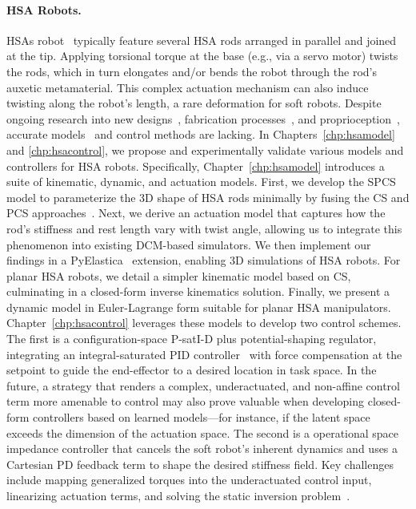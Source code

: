 \paragraph{HSA Robots.}
\glspl{HSA} robot~\citep{lipton2018handedness, chin2018compliant} typically feature several \gls{HSA} rods arranged in parallel and joined at the tip. Applying torsional torque at the base (e.g., via a servo motor) twists the rods, which in turn elongates and/or bends the robot through the rod’s auxetic metamaterial. This complex actuation mechanism can also induce twisting along the robot’s length, a rare deformation for soft robots. Despite ongoing research into new designs~\citep{good2022expanding, good2025torque}, fabrication processes~\citep{truby2021recipe}, and proprioception~\citep{zhang2022vision}, accurate models~\citep{garg2022kinematic} and control methods are lacking. In Chapters~\ref{chp:hsamodel} and \ref{chp:hsacontrol}, we propose and experimentally validate various models and controllers for \gls{HSA} robots.
%
Specifically, Chapter~\ref{chp:hsamodel} introduces a suite of kinematic, dynamic, and actuation models. First, we develop the \gls{SPCS} model to parameterize the 3D shape of \gls{HSA} rods minimally by fusing the \gls{CS} and \gls{PCS} approaches~\citep{renda2018discrete}. Next, we derive an actuation model that captures how the rod’s stiffness and rest length vary with twist angle, allowing us to integrate this phenomenon into existing \gls{DCM}-based simulators. We then implement our findings in a PyElastica~\citep{naughton2021elastica} extension, enabling 3D simulations of \gls{HSA} robots. For planar \gls{HSA} robots, we detail a simpler kinematic model based on \gls{CS}, culminating in a closed-form inverse kinematics solution. Finally, we present a dynamic model in Euler-Lagrange form suitable for planar \gls{HSA} manipulators.
%
Chapter~\ref{chp:hsacontrol} leverages these models to develop two control schemes. The first is a configuration-space P-satI-D plus potential-shaping regulator, integrating an integral-saturated PID controller~\citep{pustina2022p} with force compensation at the setpoint to guide the end-effector to a desired location in task space. 
In the future, a strategy that renders a complex, underactuated, and non-affine control term more amenable to control may also prove valuable when developing closed-form controllers based on learned models—for instance, if the latent space exceeds the dimension of the actuation space.
The second is a operational space impedance controller that cancels the soft robot’s inherent dynamics and uses a Cartesian PD feedback term to shape the desired stiffness field. Key challenges include mapping generalized torques into the underactuated control input, linearizing actuation terms, and solving the static inversion problem~\citep{della2025pushing}.


